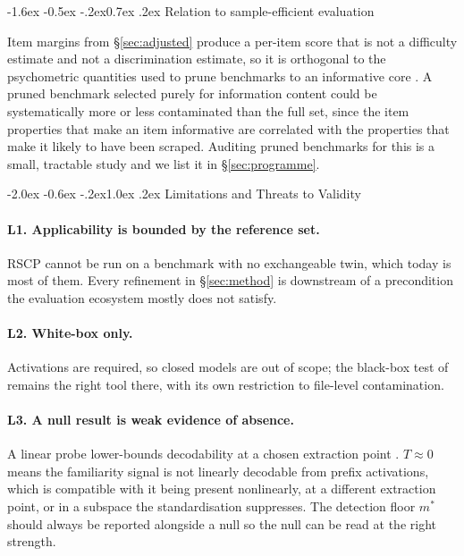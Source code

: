 \documentclass[10pt,twocolumn,letterpaper]{article}
\makeatletter
\renewcommand\section{\@startsection{section}{1}{\z@}%
  {-2.0ex \@plus -0.6ex \@minus -.2ex}{1.0ex \@plus .2ex}%
  {\normalfont\large\bfseries}}
\renewcommand\subsection{\@startsection{subsection}{2}{\z@}%
  {-1.6ex \@plus -0.5ex \@minus -.2ex}{0.7ex \@plus .2ex}%
  {\normalfont\normalsize\bfseries}}
\makeatother
\begin{document}
\subsection{Relation to sample-efficient evaluation}

Item margins from \S\ref{sec:adjusted} produce a per-item score that is not a difficulty estimate and not a discrimination estimate, so it is orthogonal to the psychometric quantities used to prune benchmarks to an informative core \cite{polo2024tinybenchmarks}. A pruned benchmark selected purely for information content could be systematically more or less contaminated than the full set, since the item properties that make an item informative are correlated with the properties that make it likely to have been scraped. Auditing pruned benchmarks for this is a small, tractable study and we list it in \S\ref{sec:programme}.

\section{Limitations and Threats to Validity}
\label{sec:limitations}

\paragraph{L1. Applicability is bounded by the reference set.} RSCP cannot be run on a benchmark with no exchangeable twin, which today is most of them. Every refinement in \S\ref{sec:method} is downstream of a precondition the evaluation ecosystem mostly does not satisfy.

\paragraph{L2. White-box only.} Activations are required, so closed models are out of scope; the black-box test of \citet{oren2024proving} remains the right tool there, with its own restriction to file-level contamination.

\paragraph{L3. A null result is weak evidence of absence.} A linear probe lower-bounds decodability at a chosen extraction point \cite{belinkov2022probing,pimentel2020info}. $T\approx 0$ means the familiarity signal is not linearly decodable from prefix activations, which is compatible with it being present nonlinearly, at a different extraction point, or in a subspace the standardisation suppresses. The detection floor $m^{*}$ should always be reported alongside a null so the null can be read at the right strength.
\end{document}
